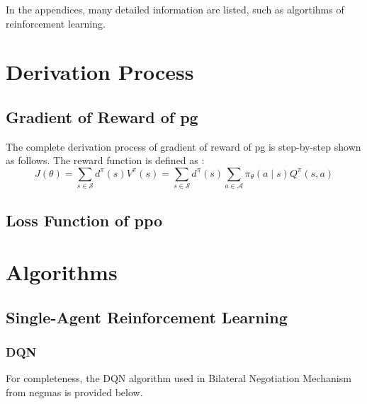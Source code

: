 \begin{appendices}
In the appendices, many detailed information are listed, such as algortihms of reinforcement learning.
	\chapter{Derivation Process} \label{appendices-derivation-process}
	\section{Gradient of Reward of \gls{pg}} \label{derivation-process-gradient-pg}
	The complete derivation process of gradient of reward of \gls{pg} is step-by-step shown as follows.
	The reward function is defined as :
	\begin{equation}
	J(\theta)=\sum_{s \in \mathcal{S}} d^{\pi}(s) V^{\pi}(s)=\sum_{s \in \mathcal{S}} d^{\pi}(s) \sum_{a \in \mathcal{A}} \pi_{\theta}(a \mid s) Q^{\pi}(s, a)
\end{equation}

	\section{Loss Function of \gls{ppo}} \label{appendix-derivation-process-loss-ppo}
	
  \chapter{Algorithms} \label{appendices-algorithms}
  \section{Single-Agent Reinforcement Learning}
	\subsection{DQN} \label{appendix:dqn}
	For completeness, the DQN algorithm used in Bilateral Negotiation Mechanism from \gls{negmas} is provided below.
	

\end{appendices}

